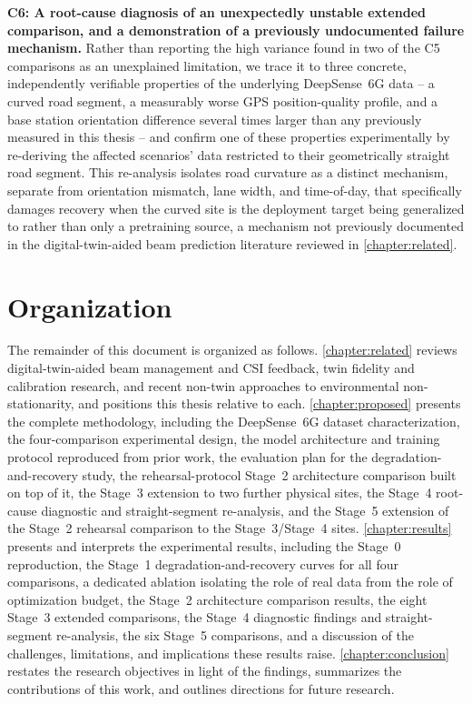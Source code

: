 \documentclass{iutbscthesis}
\begin{document}
\textbf{C6: A root-cause diagnosis of an unexpectedly unstable extended comparison, and a demonstration of a previously undocumented failure mechanism.} Rather than reporting the high variance found in two of the C5 comparisons as an unexplained limitation, we trace it to three concrete, independently verifiable properties of the underlying DeepSense~6G data -- a curved road segment, a measurably worse GPS position-quality profile, and a base station orientation difference several times larger than any previously measured in this thesis -- and confirm one of these properties experimentally by re-deriving the affected scenarios' data restricted to their geometrically straight road segment. This re-analysis isolates road curvature as a distinct mechanism, separate from orientation mismatch, lane width, and time-of-day, that specifically damages recovery when the curved site is the deployment target being generalized to rather than only a pretraining source, a mechanism not previously documented in the digital-twin-aided beam prediction literature reviewed in \autoref{chapter:related}.

\section{Organization}

The remainder of this document is organized as follows. \autoref{chapter:related} reviews digital-twin-aided beam management and CSI feedback, twin fidelity and calibration research, and recent non-twin approaches to environmental non-stationarity, and positions this thesis relative to each. \autoref{chapter:proposed} presents the complete methodology, including the DeepSense~6G dataset characterization, the four-comparison experimental design, the model architecture and training protocol reproduced from prior work, the evaluation plan for the degradation-and-recovery study, the rehearsal-protocol Stage~2 architecture comparison built on top of it, the Stage~3 extension to two further physical sites, the Stage~4 root-cause diagnostic and straight-segment re-analysis, and the Stage~5 extension of the Stage~2 rehearsal comparison to the Stage~3/Stage~4 sites. \autoref{chapter:results} presents and interprets the experimental results, including the Stage~0 reproduction, the Stage~1 degradation-and-recovery curves for all four comparisons, a dedicated ablation isolating the role of real data from the role of optimization budget, the Stage~2 architecture comparison results, the eight Stage~3 extended comparisons, the Stage~4 diagnostic findings and straight-segment re-analysis, the six Stage~5 comparisons, and a discussion of the challenges, limitations, and implications these results raise. \autoref{chapter:conclusion} restates the research objectives in light of the findings, summarizes the contributions of this work, and outlines directions for future research.
\end{document}
